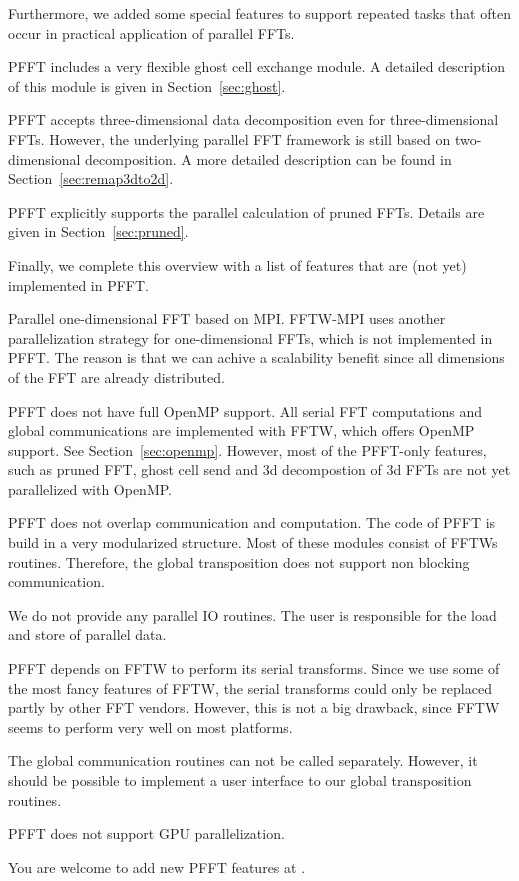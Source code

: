 Furthermore, we added some special features to support repeated tasks that often occur in practical application of parallel FFTs.
\begin{compactitem}
  \item PFFT includes a very flexible ghost cell exchange module. A detailed description of this module is given in Section~\ref{sec:ghost}.
  \item PFFT accepts three-dimensional data decomposition even for three-dimen\-sional FFTs.
        However, the underlying parallel FFT framework is still based on two-dimensional decomposition. A more detailed description can be found
        in Section~\ref{sec:remap3dto2d}.
  \item PFFT explicitly supports the parallel calculation of pruned FFTs. Details are given in Section~\ref{sec:pruned}.
\end{compactitem}

Finally, we complete this overview with a list of features that are (not yet) implemented in PFFT.
\begin{compactitem}
  \item Parallel one-dimensional FFT based on MPI. FFTW-MPI uses another parallelization strategy for one-dimensional FFTs, which is not implemented in PFFT.
        The reason is that we can achive a scalability benefit since all dimensions of the FFT are already distributed.
  \item PFFT does not have full OpenMP support. All serial FFT computations and global communications are implemented with FFTW,
        which offers OpenMP support. See Section~\ref{sec:openmp}. However, most of the PFFT-only features, such as pruned FFT, ghost cell send and 3d decompostion of 3d FFTs are not yet parallelized with OpenMP.
  \item PFFT does not overlap communication and computation. The code of PFFT is build in a very modularized structure. Most of these modules consist
        of FFTWs routines. Therefore, the global transposition does not support non blocking communication.
  \item We do not provide any parallel IO routines. The user is responsible for the load and store of parallel data.
  \item PFFT depends on FFTW to perform its serial transforms. Since we use some of the most fancy features of FFTW, the serial transforms
        could only be replaced partly by other FFT vendors. However, this is not a big drawback, since FFTW seems to perform very well on most platforms.
  \item The global communication routines can not be called separately. However, it should be possible to implement a user interface to our global
        transposition routines.
  \item PFFT does not support GPU parallelization.
\end{compactitem}
You are welcome to add new PFFT features at \webpfft.

